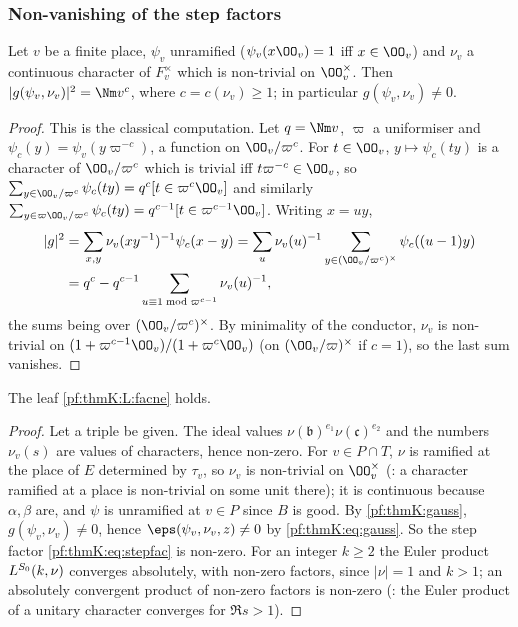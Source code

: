 \subsubsection{Non-vanishing of the step factors}\label{sec:pf:thmK:facne}

\begin{lemma}\label{pf:thmK:gauss}
Let $v$ be a finite place, $\psi_v$ unramified ($\psi_v(x\OO_v)=1$ iff $x\in\OO_v$) and $\nu_v$ a continuous character of
$F_v^\times$ which is non-trivial on $\OO_v^\times$. Then $|g(\psi_v,\nu_v)|^2=\Nm v^{c}$, where $c=c(\nu_v)\ge1$; in
particular $g(\psi_v,\nu_v)\ne0$.
\end{lemma}

\begin{proof}
This is the classical computation. Let $q=\Nm v$, $\varpi$ a uniformiser and $\psi_c(y)=\psi_v(y\varpi^{-c})$, a function on
$\OO_v/\varpi^c$. For $t\in\OO_v$, $y\mapsto\psi_c(ty)$ is a character of $\OO_v/\varpi^c$ which is trivial iff
$t\varpi^{-c}\in\OO_v$, so $\sum_{y\in\OO_v/\varpi^c}\psi_c(ty)=q^c[t\in\varpi^c\OO_v]$ and similarly
$\sum_{y\in\varpi\OO_v/\varpi^c}\psi_c(ty)=q^{c-1}[t\in\varpi^{c-1}\OO_v]$. Writing $x=uy$,
\begin{align*}
|g|^2&=\sum_{x,y}\nu_v(xy^{-1})^{-1}\psi_c(x-y)=\sum_{u}\nu_v(u)^{-1}\sum_{y\in(\OO_v/\varpi^c)^\times}\psi_c((u-1)y)\\
&=q^c-q^{c-1}\sum_{u\equiv1\bmod\varpi^{c-1}}\nu_v(u)^{-1},
\end{align*}
the sums being over $(\OO_v/\varpi^c)^\times$. By minimality of the conductor, $\nu_v$ is non-trivial on
$(1+\varpi^{c-1}\OO_v)/(1+\varpi^c\OO_v)$ (on $(\OO_v/\varpi)^\times$ if $c=1$), so the last sum vanishes.
\end{proof}

\begin{proposition}\label{pf:thmK:facne}
The leaf \ref{pf:thmK:L:facne} holds.
\end{proposition}

\begin{proof}
Let a triple be given. The ideal values $\nu(\mathfrak b)^{e_1}\nu(\mathfrak c)^{e_2}$ and the numbers $\nu_v(s)$ are values of
characters, hence non-zero. For $v\in P\cap T$, $\nu$ is ramified at the place of $E$ determined by $\tau_v$, so $\nu_v$ is
non-trivial on $\OO_v^\times$ (: a character ramified at a place is
non-trivial on some unit there); it is continuous because $\alpha,\beta$ are, and $\psi$ is unramified at $v\in P$ since $B$
is good. By \cref{pf:thmK:gauss}, $g(\psi_v,\nu_v)\ne0$, hence $\eps(\psi_v,\nu_v,z)\ne0$ by \eqref{pf:thmK:eq:gauss}. So the
step factor \eqref{pf:thmK:eq:stepfac} is non-zero. For an integer $k\ge2$ the Euler product $L^{S_0}(k,\nu)$ converges
absolutely, with non-zero factors, since $|\nu|=1$ and $k>1$; an absolutely convergent product of non-zero factors is
non-zero (: the Euler product of a unitary character converges for $\Re s>1$).
\end{proof}

